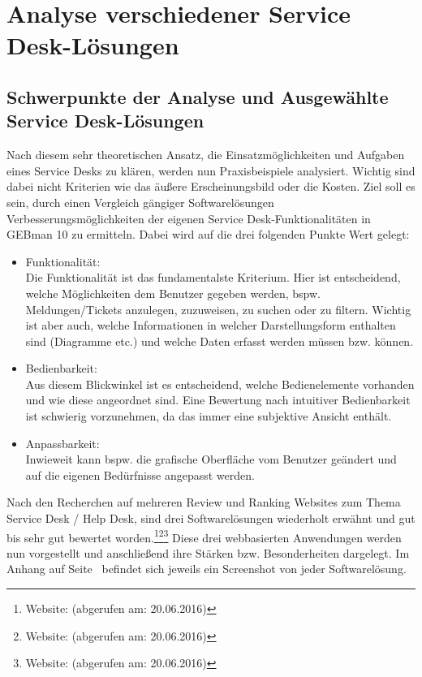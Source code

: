 \section{Analyse verschiedener Service Desk-Lösungen}

\subsection{Schwerpunkte der Analyse und Ausgewählte Service Desk-Lösungen}

\noindent
Nach diesem sehr theoretischen Ansatz, die Einsatzmöglichkeiten und Aufgaben eines Service Desks zu klären, werden nun Praxisbeispiele analysiert. Wichtig sind dabei nicht Kriterien wie das äußere Erscheinungsbild oder die Kosten. Ziel soll es sein, durch einen Vergleich gängiger Softwarelösungen Verbesserungsmöglichkeiten der eigenen Service Desk-Funktionalitäten in GEBman 10 zu ermitteln. Dabei wird auf die drei folgenden Punkte Wert gelegt:

\begin{itemize}
\item Funktionalität:\\
		Die Funktionalität ist das fundamentalste Kriterium. Hier ist entscheidend, welche 			
		Möglichkeiten dem Benutzer gegeben werden, bspw. Meldungen/Tickets anzulegen, zuzuweisen, 
		zu suchen oder zu filtern. Wichtig ist aber auch, welche Informationen in welcher 
		Darstellungsform enthalten sind (Diagramme etc.) und welche Daten erfasst werden müssen 
		bzw. können.\\
		 
\item Bedienbarkeit:\\
		Aus diesem Blickwinkel ist es entscheidend, welche Bedienelemente vorhanden und wie diese angeordnet sind. Eine	
		Bewertung nach intuitiver Bedienbarkeit ist schwierig vorzunehmen, da das immer eine
		subjektive Ansicht enthält.\\
		
\item Anpassbarkeit:\\
		Inwieweit kann bspw. die grafische Oberfläche vom Benutzer geändert und auf die 
		eigenen Bedürfnisse angepasst werden.\\		
\end{itemize}


\noindent
Nach den Recherchen auf mehreren Review und Ranking Websites zum Thema Service Desk / Help Desk, sind drei Softwarelösungen wiederholt erwähnt und gut bis sehr gut bewertet worden.\footnote{Website: \citeauthor{Ranking1} (abgerufen am: 20.06.2016)}\footnote{Website: \citeauthor{Ranking2} (abgerufen am: 20.06.2016)}\footnote{Website: \citeauthor{Ranking3} (abgerufen am: 20.06.2016)} Diese drei webbasierten Anwendungen werden nun vorgestellt und anschließend ihre Stärken bzw. Besonderheiten dargelegt. Im Anhang auf Seite~\pageref{Anhang3_1} befindet sich jeweils ein Screenshot von jeder Softwarelösung.

